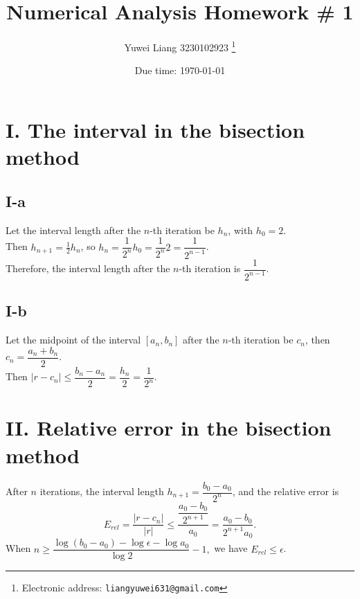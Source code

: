 \documentclass[a4paper]{article}
\begin{document}
\title{Numerical Analysis Homework \# 1}

\author{Yuwei Liang 3230102923
  \thanks{Electronic address: \texttt{liangyuwei631@gmail.com}}}

\date{Due time: \today}

\maketitle

\section*{I. The interval in the bisection method}

\subsection*{I-a}

Let the interval length after the $n$-th iteration be $h_n$, with $h_0 = 2$.\\
\hspace*{2em} Then $h_{n+1} = \frac{1}{2}h_n$, so $h_n = \dfrac{1}{2^n}h_0 = \dfrac{1}{2^n}2 = \dfrac{1}{2^{n-1}}$. \\
\hspace*{2em} Therefore, the interval length after the $n$-th iteration is $\dfrac{1}{2^{n-1}}$.

\subsection*{I-b}

Let the midpoint of the interval $[a_n, b_n]$ after the $n$-th iteration be $c_n$, then $c_n = \dfrac{a_n + b_n}{2}$.\\
\hspace*{2em} Then $ |r - c_n| \leq \dfrac{b_n - a_n}{2} = \dfrac{h_n}{2} = \dfrac{1}{2^{n}}$.

\section*{II. Relative error in the bisection method}

After $n$ iterations, the interval length $h_{n+1} = \dfrac{b_0 - a_0}{2^n}$, and the relative error is
\[
E_{rel} = \dfrac{|r - c_n|}{|r|} \leq \dfrac{\dfrac{a_0 - b_0}{2^{n+1}}}{a_0} =  \dfrac{a_0 - b_0}{2^{n+1} a_0}.
\]
\hspace*{2em} When
$
n \geq \dfrac{\log(b_0 - a_0) - \log \epsilon - \log a_0}{\log 2} - 1,
$ we have $E_{rel} \leq \epsilon$.
\end{document}
